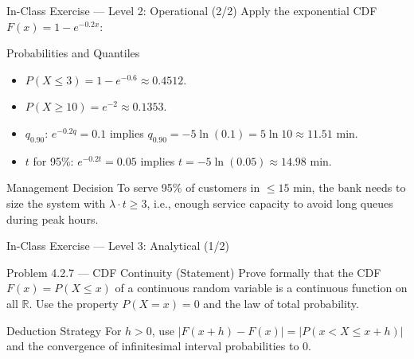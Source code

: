 \documentclass[aspectratio=169,xcolor={dvipsnames,table}]{beamer}
\begin{document}
\begin{frame}{In-Class Exercise --- Level 2: Operational (2/2)}
	\vspace{-0.05cm}
	\scriptsize
	Apply the exponential CDF $F(x) = 1 - e^{-0.2 x}$: \pause
	\begin{block}{Probabilities and Quantiles}
		\begin{itemize}\itemsep=0.05cm
			\item $P(X \le 3) = 1 - e^{-0.6} \approx 0.4512$. \pause
			\item $P(X \ge 10) = e^{-2} \approx 0.1353$. \pause
			\item $q_{0.90}$: $e^{-0.2 q} = 0.1$ implies $q_{0.90} = -5\ln(0.1) = 5\ln 10 \approx 11.51$ min. \pause
			\item $t$ for 95\%: $e^{-0.2 t} = 0.05$ implies $t = -5\ln(0.05) \approx 14.98$ min.
		\end{itemize}
	\end{block}
	\vspace{0.05cm}
	\pause
	\begin{alertblock}{Management Decision}
		\scriptsize
		To serve 95\% of customers in $\le 15$ min, the bank needs to size the system with $\lambda \cdot t \ge 3$, i.e., enough service capacity to avoid long queues during peak hours.
	\end{alertblock}
\end{frame}

\begin{frame}{In-Class Exercise --- Level 3: Analytical (1/2)}
	\vspace{-0.1cm}
	\begin{block}{Problem 4.2.7 --- CDF Continuity (Statement)}
		Prove formally that the CDF $F(x) = P(X \le x)$ of a continuous random variable is a continuous function on all $\mathbb{R}$. Use the property $P(X = x) = 0$ and the law of total probability.
	\end{block}
	\vspace{0.1cm}
	\pause
	\begin{alertblock}{Deduction Strategy}
		\scriptsize
		For $h > 0$, use $|F(x+h) - F(x)| = |P(x < X \le x+h)|$ and the convergence of infinitesimal interval probabilities to 0.
	\end{alertblock}
\end{frame}
\end{document}

